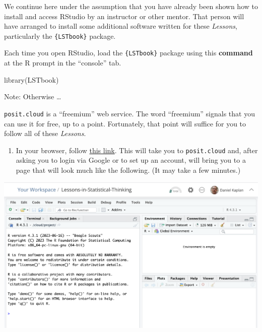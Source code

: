 \documentclass[
  letterpaper,
  DIV=11,
  numbers=noendperiod,
  oneside]{scrartcl}
\newenvironment{Shaded}{\begin{snugshade}}{\end{snugshade}}
\newcommand{\FunctionTok}[1]{\textcolor[rgb]{0.28,0.35,0.67}{#1}}
\newcommand{\NormalTok}[1]{\textcolor[rgb]{0.00,0.23,0.31}{#1}}
\providecommand{\tightlist}{%
  \setlength{\itemsep}{0pt}\setlength{\parskip}{0pt}}\usepackage{longtable,booktabs,array}
\begin{document}
We continue here under the assumption that you have already been shown
how to install and access RStudio by an instructor or other mentor. That
person will have arranged to install some additional software written
for these \emph{Lessons}, particularly the \texttt{\{LSTbook\}} package.

Each time you open RStudio, load the \texttt{\{LSTbook\}} package using
this \textbf{command} at the R prompt in the ``console'' tab.

\begin{Shaded}
\begin{Highlighting}[]
\FunctionTok{library}\NormalTok{(LSTbook)}
\end{Highlighting}
\end{Shaded}

\begin{tcolorbox}[enhanced jigsaw, colbacktitle=quarto-callout-note-color!10!white, opacityback=0, breakable, opacitybacktitle=0.6, colback=white, coltitle=black, arc=.35mm, title=\textcolor{quarto-callout-note-color}{\faInfo}\hspace{0.5em}{Starting out with R via \texttt{posit.cloud}}, left=2mm, colframe=quarto-callout-note-color-frame, rightrule=.15mm, bottomrule=.15mm, leftrule=.75mm, bottomtitle=1mm, toptitle=1mm, titlerule=0mm, toprule=.15mm]

Note: Otherwise \ldots{}

\texttt{posit.cloud} is a ``freemium'' web service. The word
``freemium'' signals that you can use it for free, up to a point.
Fortunately, that point will suffice for you to follow all of these
\emph{Lessons}.

\begin{enumerate}
\def\labelenumi{\arabic{enumi}.}
\tightlist
\item
  In your browser, follow
  \href{https://posit.cloud/content/6532153}{this link}. This will take
  you to \texttt{posit.cloud} and, after asking you to login via Google
  or to set up an account, will bring you to a page that will look much
  like the following. (It may take a few minutes.)
\end{enumerate}

\includegraphics{www/posit-cloud.png}


\end{tcolorbox}
\end{document}
